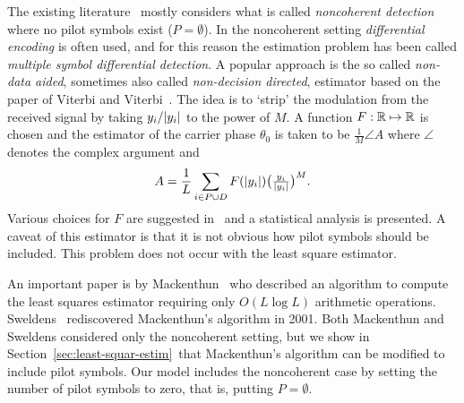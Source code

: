 \documentclass[journal]{IEEEtran}
\begin{document}
The existing literature~\cite{Mackenthun1994,Cowley_ref_sym_carr_1998,ViterbiViterbi_phase_est_1983,Sweldens2001,Wilson1989,Makrakis1990,Liu1991} mostly considers what is called \emph{noncoherent detection} where no pilot symbols exist ($P = \emptyset$).  In the noncoherent setting \emph{differential encoding} is often used, and for this reason the estimation problem has been called \emph{multiple symbol differential detection}.  A popular approach is the so called \emph{non-data aided}, sometimes also called \emph{non-decision directed}, estimator based on the paper of Viterbi and Viterbi~\cite{ViterbiViterbi_phase_est_1983}.  The idea is to `strip' the modulation from the received signal by taking $y_i / {\left\vert y_i \right\vert}$ to the power of $M$.  A function $F: {\mathbb R} \mapsto {\mathbb R}$ is chosen and the estimator of the carrier phase $\theta_0$ is taken to be $\tfrac{1}{M}\angle{A}$ where $\angle$ denotes the complex argument and
\begin{equation}\label{eq:viterbiviterbi}
A = \frac{1}{L}\sum_{i \in P \cup D} F({\left\vert y_i \right\vert}) \big(\tfrac{y_i}{{\left\vert y_i \right\vert}}\big)^M.
\end{equation}
Various choices for $F$ are suggested in~\cite{ViterbiViterbi_phase_est_1983} and a statistical analysis is presented.  A caveat of this estimator is that it is not obvious how pilot symbols should be included. %
This problem does not occur with the least square estimator.

An important paper is by Mackenthun~\cite{Mackenthun1994} who described an algorithm to compute the least squares estimator requiring only $O(L \log L)$ arithmetic operations.  Sweldens~\cite{Sweldens2001} rediscovered Mackenthun's algorithm in 2001.  Both Mackenthun and Sweldens considered only the noncoherent setting, but we show in Section~\ref{sec:least-squar-estim}~that Mackenthun's algorithm can be modified to include pilot symbols. Our model includes the noncoherent case by setting the number of pilot symbols to zero, that is, putting $P = \emptyset$.  
\end{document}
